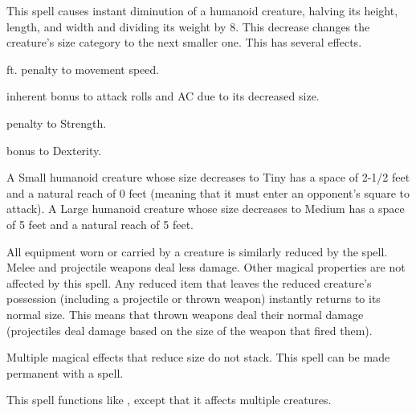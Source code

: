 \spellrng{\rngclose}
\begin{spelleffect}
  This spell causes instant diminution of a humanoid creature, halving its height, length, and width and dividing its weight by 8. This decrease changes the creature's size category to the next smaller one. This has several effects.
  \begin{itemize*} 
    \item {} ft. penalty to movement speed.
    \item {} inherent bonus to attack rolls and AC due to its decreased size.
  \item {} penalty to Strength.
  \item {} bonus to Dexterity.
  \end{itemize*}
  \par A Small humanoid creature whose size decreases to Tiny has a space of 2-1/2 feet and a natural reach of 0 feet (meaning that it must enter an opponent's square to attack). A Large humanoid creature whose size decreases to Medium has a space of 5 feet and a natural reach of 5 feet.
  \par All equipment worn or carried by a creature is similarly reduced by the spell. Melee and projectile weapons deal less damage. Other magical properties are not affected by this spell. Any reduced item that leaves the reduced creature's possession (including a projectile or thrown weapon) instantly returns to its normal size. This means that thrown weapons deal their normal damage (projectiles deal damage based on the size of the weapon that fired them).
\end{spelleffect}
\begin{spellnotes}
  Multiple magical effects that reduce size do not stack. This spell can be made permanent with a  spell.
\end{spellnotes}

\spellrng{\rngmed}
\begin{spelleffect}
  This spell functions like , except that it affects multiple creatures.
\end{spelleffect}


